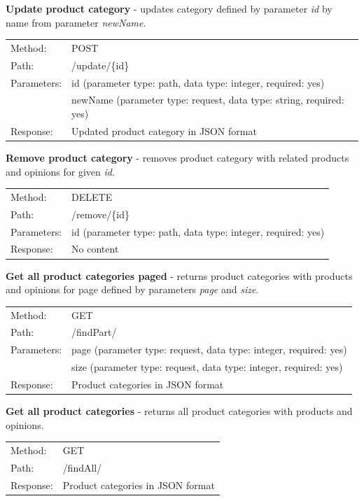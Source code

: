 \documentclass[10pt,a4paper]{article}
\begin{document}
\noindent\textbf{Update product category} - updates category defined by parameter \textit{id} by name from parameter \textit{newName}. 

  \begin{tabular}{ll}
  Method: & POST \\
  Path: & /update/\{id\} \\
  Parameters: & id (parameter type: path, data type: integer, required: yes)\\
              & newName (parameter type: request, data type: string, required: yes)\\
  Response: & Updated product category in JSON format  \\
  \end{tabular} \vspace{5mm}

\noindent\textbf{Remove product category} - removes product category with related products and opinions for given \textit{id}.

  \begin{tabular}{ll}
  Method: & DELETE \\
  Path: & /remove/\{id\} \\
  Parameters: & id (parameter type: path, data type: integer, required: yes)\\
  Response: & No content  \\
  \end{tabular} \vspace{5mm}

\noindent\textbf{Get all product categories paged} - returns product categories with products and opinions for page defined by parameters \textit{page} and \textit{size}.

  \begin{tabular}{ll}
  Method: & GET \\
  Path: & /findPart/ \\
  Parameters: & page (parameter type: request, data type: integer, required: yes)\\
              & size (parameter type: request, data type: integer, required: yes)\\
  Response: & Product categories in JSON format  \\
  \end{tabular} \vspace{5mm}
  
\noindent\textbf{Get all product categories} - returns all product categories with products and opinions.

  \begin{tabular}{ll}
  Method: & GET \\
  Path: & /findAll/ \\
  Response: & Product categories in JSON format  \\
  \end{tabular} \vspace{5mm}
  
\end{document}
